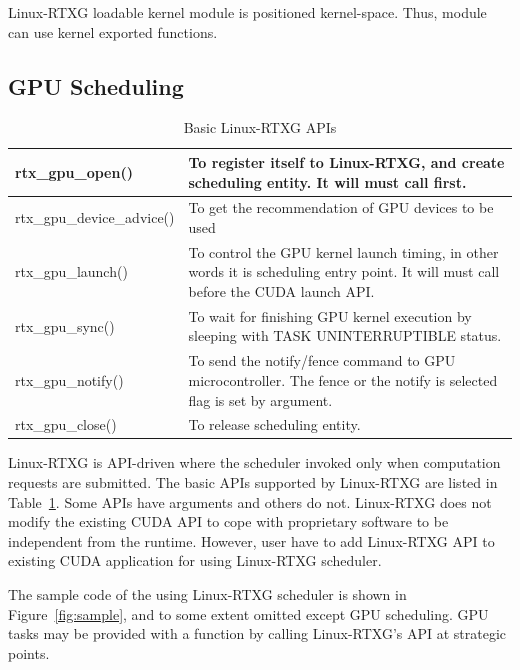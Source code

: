 Linux-RTXG loadable kernel module is positioned kernel-space.
Thus, module can use kernel exported functions.

\subsection{GPU Scheduling}
\begin{table}[t]
\begin{center}
\caption{Basic Linux-RTXG APIs}
\label{tab:rtx-api}
\begin{tabular}{|l|p{50em}|} \hline
rtx\_gpu\_open() & To register itself to Linux-RTXG, and create scheduling entity. It will must call first. \\ \hline
rtx\_gpu\_device\_advice() & To get the recommendation of GPU devices to be used \\ \hline
rtx\_gpu\_launch() & To control the GPU kernel launch timing, in other words it is scheduling entry point. It will must call before the CUDA launch API. \\ \hline
rtx\_gpu\_sync() & To wait for finishing GPU kernel execution by sleeping with TASK UNINTERRUPTIBLE status.\\ \hline
rtx\_gpu\_notify() & To send the notify/fence command to GPU microcontroller. The fence or the notify is selected flag is set by argument.\\ \hline
rtx\_gpu\_close() & To release scheduling entity.\\ \hline
\end{tabular}
\end{center}
\end{table}

Linux-RTXG is API-driven where the scheduler invoked only when computation requests are submitted.
The basic APIs supported by Linux-RTXG are listed in Table~\ref{tab:rtx-api}.
Some APIs have arguments and others do not.
Linux-RTXG does not modify the existing CUDA API to cope with proprietary software to be independent from the runtime.
However, user have to add Linux-RTXG API to existing CUDA application for using Linux-RTXG scheduler.

The sample code of the using Linux-RTXG scheduler is shown in Figure~\ref{fig:sample},
and to some extent omitted except GPU scheduling.
GPU tasks may be provided with a function by calling Linux-RTXG's API at strategic points.

